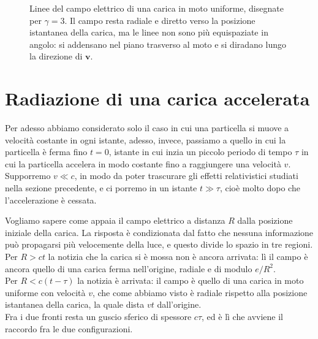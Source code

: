 \begin{figure}[H]
    \centering
    \caption{Linee del campo elettrico di una carica in moto uniforme, disegnate per $\gamma = 3$. Il campo resta radiale e diretto verso la posizione istantanea della carica, ma le linee non sono più equispaziate in angolo: si addensano nel piano trasverso al moto e si diradano lungo la direzione di $\mathbf{v}$.}
    \label{fig:campo_carica_moto}
\end{figure}

\section{Radiazione di una carica accelerata}

Per adesso abbiamo considerato solo il caso in cui una particella si muove a velocità costante in ogni istante, adesso, invece, passiamo a quello in cui la particella è ferma fino $t = 0$, istante in cui inzia un piccolo periodo di tempo $\tau$ in cui la particella accelera in modo costante fino a raggiungere una velocità $v$. Supporremo $v \ll c$, in modo da poter trascurare gli effetti relativistici studiati nella sezione precedente, e ci porremo in un istante $t \gg \tau$, cioè molto dopo che l'accelerazione è cessata.

Vogliamo sapere come appaia il campo elettrico a distanza $R$ dalla posizione iniziale della carica. La risposta è condizionata dal fatto che nessuna informazione può propagarsi più velocemente della luce, e questo divide lo spazio in tre regioni.\\
Per $R > ct$ la notizia che la carica si è mossa non è ancora arrivata: lì il campo è ancora quello di una carica ferma nell'origine, radiale e di modulo $e/R^2$. \\
Per $R < c(t-\tau)$ la notizia è arrivata: il campo è quello di una carica in moto uniforme con velocità $v$, che come abbiamo visto è radiale rispetto alla posizione istantanea della carica, la quale dista $vt$ dall'origine.\\
Fra i due fronti resta un guscio sferico di spessore $c\tau$, ed è lì che avviene il raccordo fra le due configurazioni.

